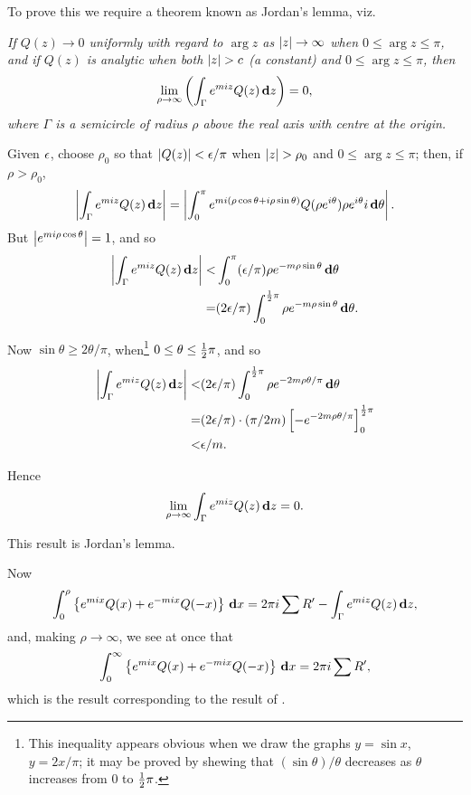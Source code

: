 To prove this we require a theorem known as Jordan's lemma, viz.

\emph{If $Q(z) \rightarrow 0$ uniformly with regard to $\arg z$ as
  $\left| z \right| \rightarrow \infty$ when $0 \leq \arg z \leq \pi$,
  and if $Q(z)$ is analytic when both $\left| z \right| > c$ (a constant)
  and $0 \leq \arg z \leq \pi$, then
  $$
  \lim_{\rho\rightarrow\infty}
  \left(  \int_{\Gamma} e^{miz} Q(z) \, \mathbf{d} z   \right)
  =
  0,
  $$
  where $\Gamma$ is a semicircle of radius $\rho$ above the real axis with centre at
  the origin.}

Given $\epsilon$, choose $\rho_{0}$ so that $\left| Q(z) \right| < \epsilon/\pi$
when $\left| z \right| > \rho_{0}$ and
$0 \leq \arg z \leq \pi$;
then, if $\rho > \rho_{0}$,
$$
\left|  \int_{\Gamma} e^{miz} Q(z) \, \mathbf{d} z  \right|
=
\left| 
  \int_{0}^{\pi}
  e^{mi (\rho \cos\theta + i\rho \sin\theta)}
  Q(\rho e^{i\theta})
  \rho e^{i \theta}
  i \, \mathbf{d} \theta
 \right|.
$$
But $\left|  e^{mi\rho\cos\theta}  \right| = 1$, and so
\begin{align*}
  \left|  \int_{\Gamma} e^{miz} Q(z) \, \mathbf{d} z  \right|
  <&
  \int_{0}^{\pi} (\epsilon/\pi) \rho e^{-m\rho\sin\theta} \, \mathbf{d}\theta
  \\
  =&
  (2\epsilon/\pi)
  \int_{0}^{\frac{1}{2}\pi} \rho e^{-m\rho\sin\theta} \, \mathbf{d}\theta.
\end{align*}

Now $\sin\theta \geq 2\theta/\pi$, when\footnote{This inequality
  appears obvious when we draw the graphs $y = \sin x$, $y = 2x/\pi$;
  it may be proved by shewing that $(\sin\theta)/\theta$ decreases as
  $\theta$ increases from $0$ to $\frac{1}{2}\pi$.
} $0 \leq \theta \leq \frac{1}{2}\pi$, and so 
\begin{align*}
  \left|  \int_{\Gamma} e^{miz} Q(z) \, \mathbf{d} z  \right|
  <&
  (2\epsilon/\pi)
  \int_{0}^{\frac{1}{2}\pi}
  \rho e^{-2m\rho\theta/\pi} \, \mathbf{d}\theta
  \\
  =&
  (2\epsilon/\pi) \cdot (\pi/2m)
  \left[  -e^{-2m\rho\theta/\pi}  \right]_{0}^{\frac{1}{2}\pi}
  \\
  <&
  \epsilon/m.
\end{align*}

%
%

Hence
$$
\lim_{\rho\rightarrow\infty} \int_{\Gamma} e^{miz} Q(z) \, \mathbf{d} z = 0.
$$

This result is Jordan's lemma.

Now
$$
\int_{0}^{\rho}
\left\{ 
  e^{mix} Q(x) + e^{-mix} Q(-x)
 \right\}
\, \mathbf{d} x
=
2 \pi i \sum R'
-
\int_{\Gamma} e^{miz} Q(z) \, \mathbf{d} z,
$$
and, making $\rho\rightarrow\infty$, we see at once that
$$
\int_{0}^{\infty}
\left\{ 
  e^{mix} Q(x) + e^{-mix} Q(-x)
 \right\}
\, \mathbf{d} x
=
2 \pi i \sum R',
$$
which is the result corresponding to the result of .

